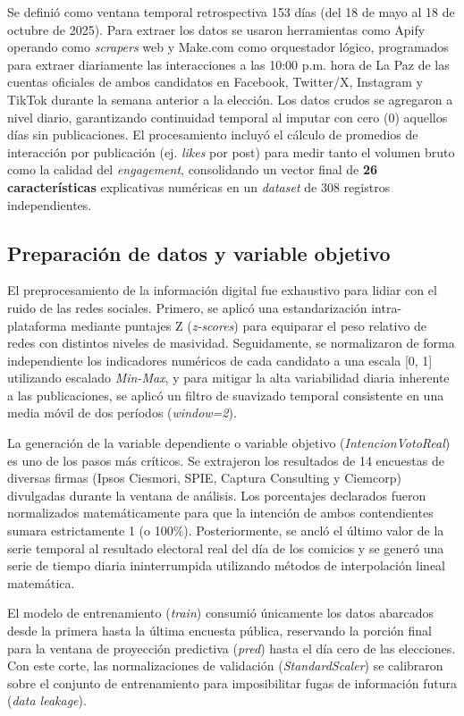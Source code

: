 Se definió como ventana temporal retrospectiva 153 días (del 18 de mayo al 18 de octubre de 2025). Para extraer los datos se usaron herramientas como Apify operando como \textit{scrapers} web y Make.com como orquestador lógico, programados para extraer diariamente las interacciones a las 10:00 p.m. hora de La Paz de las cuentas oficiales de ambos candidatos en Facebook, Twitter/X, Instagram y TikTok durante la semana anterior a la elección. Los datos crudos se agregaron a nivel diario, garantizando continuidad temporal al imputar con cero (0) aquellos días sin publicaciones. El procesamiento incluyó el cálculo de promedios de interacción por publicación (ej. \textit{likes} por post) para medir tanto el volumen bruto como la calidad del \textit{engagement}, consolidando un vector final de \textbf{26 características} explicativas numéricas en un \textit{dataset} de 308 registros independientes.

\subsection{Preparación de datos y variable objetivo}

El preprocesamiento de la información digital fue exhaustivo para lidiar con el ruido de las redes sociales. Primero, se aplicó una estandarización intra-plataforma mediante puntajes Z (\textit{z-scores}) para equiparar el peso relativo de redes con distintos niveles de masividad. Seguidamente, se normalizaron de forma independiente los indicadores numéricos de cada candidato a una escala [0, 1] utilizando escalado \textit{Min-Max}, y para mitigar la alta variabilidad diaria inherente a las publicaciones, se aplicó un filtro de suavizado temporal consistente en una media móvil de dos períodos (\textit{window=2}).

La generación de la variable dependiente o variable objetivo (\textit{IntencionVotoReal}) es uno de los pasos más críticos. Se extrajeron los resultados de 14 encuestas de diversas firmas (Ipsos Ciesmori, SPIE, Captura Consulting y Ciemcorp) divulgadas durante la ventana de análisis. Los porcentajes declarados fueron normalizados matemáticamente para que la intención de ambos contendientes sumara estrictamente 1 (o 100\%). Posteriormente, se ancló el último valor de la serie temporal al resultado electoral real del día de los comicios y se generó una serie de tiempo diaria ininterrumpida utilizando métodos de interpolación lineal matemática. 

El modelo de entrenamiento (\textit{train}) consumió únicamente los datos abarcados desde la primera hasta la última encuesta pública, reservando la porción final para la ventana de proyección predictiva (\textit{pred}) hasta el día cero de las elecciones. Con este corte, las normalizaciones de validación (\textit{StandardScaler}) se calibraron sobre el conjunto de entrenamiento para imposibilitar fugas de información futura (\textit{data leakage}).

